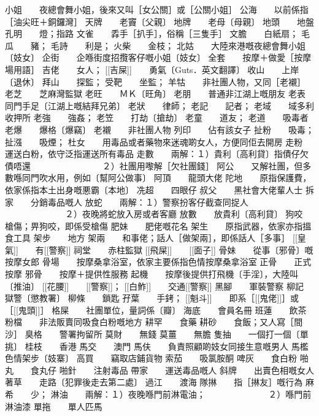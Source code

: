 小姐　　夜總會舞小姐，後來又叫［女公關］或［公關小姐］  
公海　　以前係指［油尖旺＋銅鑼灣］  
天牌　　老竇〔父親〕  
地牌　　老母〔母親〕  
地頭　　地盤  
孔明　　燈；指路  
文雀　　掱手［扒手］，俗稱［三隻手］  
文膽　　白紙扇；  
毛瓜　　豬；  
毛詩　　利是；  
火柴　　金枝；  
北姑　　大陸來港嘅夜總會舞小姐〔妓女〕  
企街　　企喺街度招攬客仔嘅小姐〔妓女〕  
全套　　按摩＋做愛［按摩場用語］  
吉佬　　女人；  
[[吉屎]]　　勇氣〔Guts．英文翻譯〕  
收山　　上岸〔退休〕  
拜山　　探監；  
受靶　　坐監；  
羊牯　　非社團人物，又同［老襯］  
老芝　　芝麻灣監獄  
老旺　　ＭＫ〔旺角〕  
老朋　　普通非江湖上嘅朋友  
老表　　同門手足〔江湖上嘅結拜兄弟〕  
老狀　　律師；  
老記　　記者；  
老域　　域多利收押所  
老強　　強姦；  
老笠　　打劫〔搶劫〕  
老童　　道友；  
老道　　吸毒者  
老爆　　爆格〔爆竊〕  
老襯　　非社團人物  
列印　　佔有該女子  
扯粉　　吸毒；  
扯漒　　吸煙；  
杜女　　用毒品或者藥物來迷魂啲女人，方便同佢去開房  
走粉　　運送白粉，依守泛指運送所有毒品  
走數　　兩解：１）貴利〔高利貸〕指債仔欠債唔還　  
　　　　　　　２）社團用嚟解［欠社團錢］  
阿公　　又解社團，但多數喺同門吹水用，例如〔幫阿公做事〕  
阿頂　　龍頭大佬  
陀地　　原指保護費，依家係指本土出身嘅悪霸〔本地〕  
冼超　　四眼仔  
叔父　　黑社會大佬輩人士  
拆家　　分銷毒品嘅人  
放蛇　　兩解：１）警察扮客仔截查同捉人  
　　　　　　　２）夜晚將蛇放入房或者客廳  
放數　　放貴利〔高利貸〕  
狗咬　　槍傷；畀狗咬，即係受槍傷  
肥妹　　肥佬嘅花名  
架生　　原指武器，依家亦指搵食工具  
架步　　地方  
架兩　　和事佬；話人［做架兩］，即係話人［多事］  
[[皇氣]]　　有[[警察]]  
祠堂　　赤柱監獄  
[[飛屎]]　　[[面子]]  
骨妹　　從事〔邪骨〕嘅按摩女郎  
骨場　　按摩桑拿浴室，依家主要係指色情按摩桑拿浴室  
正骨　　正式按摩  
邪骨　　按摩＋提供性服務  
起機　　按摩後提供打飛機〔手淫〕，大陸叫〔推油〕  
[[花腰]]　　[[警察]]；  
[[白鮓]]　　交通[[警察]]  
黑腳　　軍裝警察  
柳記　　獄警〔懲教署〕  
柳條　　鎖匙  
孖葉　　手銬；  
[[魁斗]]　　即系［[[鬼佬]]］或［[[鬼頭]]］  
格屎　　社團單位，量詞係〔瓣〕  
海底　　會員名冊  
班蓮　　飲茶  
粉檔　　非法販賣同吸食白粉嘅地方  
耕罕　　食藥  
耕砂　　食飯；又人寫［間沙］  
臭格　　警署拘留所  
莫財　　無錢  
莫薑　　無膽  
隻抽　　一個打一個〔單挑〕  
桂枝　　香港  
馬交　　澳門  
馬伕　　負責照顧啲妓女同接生意嘅男人  
馬檻　　色情架步〔妓寨〕  
高買　　竊取店鋪貨物  
索茄　　吸氯胺酮  
啤灰　　食白粉  
啪丸　　食丸仔  
啪針　　注射毒品  
帶家　　運送毒品嘅人  
斜牌　　出賣色相嘅女人  
著草　　走路〔犯罪後走去第二處〕  
過江　　渡海  
隊㨆　　指［㨆友］嘅行為  
麻希　　少；  
淋油　　兩解：１）夜晚喺門前淋電油；  
　　　　　　　２）喺門前淋油漆  
單拖　　單人匹馬  
